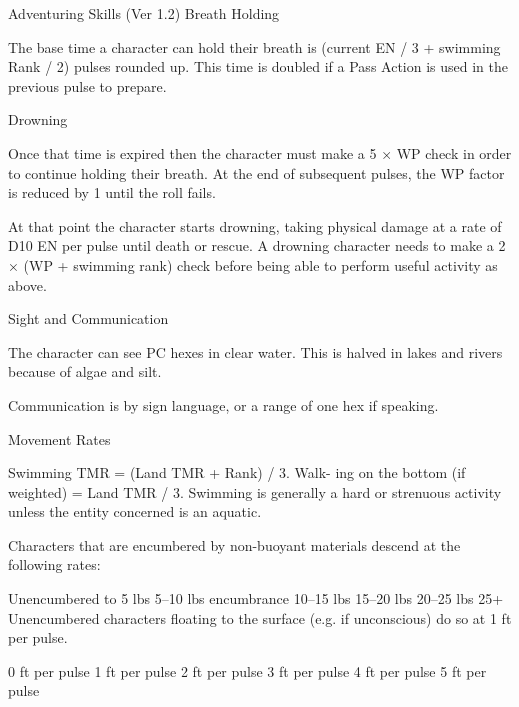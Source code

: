 \begin{Chapter}{Adventuring Skills (Ver 1.2)}
Breath Holding 

The  base  time  a  character  can  hold  their  breath  is 
(current  EN  /  3  +  swimming  Rank  /  2)  pulses 
rounded  up.  This  time  is  doubled  if  a  Pass Action 
is used in the previous pulse to prepare. 

Drowning 

Once  that  time  is  expired  then  the  character  must 
make a 5 × WP check in order to continue holding 
their  breath.  At  the  end  of  subsequent  pulses,  the 
WP factor is reduced by 1 until the roll fails. 

At  that  point  the  character  starts  drowning,  taking 
physical  damage  at  a  rate  of  D10  EN  per  pulse 
until  death  or  rescue.  A  drowning  character  needs 
to make a 2 × (WP + swimming rank) check before 
being able to perform useful activity as above. 

Sight and Communication 

The character can see PC hexes in clear water. This 
is  halved  in  lakes  and  rivers  because  of  algae  and 
silt. 

Communication  is by  sign  language, or  a  range  of 
one hex if speaking. 

Movement Rates 

Swimming TMR = (Land TMR + Rank) / 3. Walk-
ing  on  the  bottom  (if  weighted)  =  Land  TMR  /  3. 
Swimming is generally a hard or strenuous activity 
unless the entity concerned is an aquatic. 

Characters  that  are  encumbered  by  non-buoyant 
materials descend at the following rates: 

Unencumbered to 5 lbs 
5–10 lbs encumbrance 
10–15 lbs 
15–20 lbs 
20–25 lbs 
25+ 
Unencumbered  characters  floating  to  the  surface 
(e.g. if unconscious) do so at 1 ft per pulse. 

0 ft per pulse 
1 ft per pulse 
2 ft per pulse 
3 ft per pulse 
4 ft per pulse 
5 ft per pulse 
\end{Chapter}
